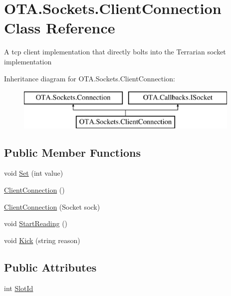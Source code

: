\hypertarget{class_o_t_a_1_1_sockets_1_1_client_connection}{}\section{O\+T\+A.\+Sockets.\+Client\+Connection Class Reference}
\label{class_o_t_a_1_1_sockets_1_1_client_connection}


A tcp client implementation that directly bolts into the Terrarian socket implementation  


Inheritance diagram for O\+T\+A.\+Sockets.\+Client\+Connection\+:\begin{figure}[H]
\begin{center}
\leavevmode
\includegraphics[height=2.000000cm]{class_o_t_a_1_1_sockets_1_1_client_connection}
\end{center}
\end{figure}
\subsection*{Public Member Functions}
\begin{DoxyCompactItemize}
\item 
void \hyperlink{class_o_t_a_1_1_sockets_1_1_client_connection_a770766c35a3ead39c9bcb0798bc5dcdc}{Set} (int value)
\item 
\hyperlink{class_o_t_a_1_1_sockets_1_1_client_connection_a65f8996d009af59680de5f45b9084a67}{Client\+Connection} ()
\item 
\hyperlink{class_o_t_a_1_1_sockets_1_1_client_connection_ac49558634e78478cdf3151ca6bb931e0}{Client\+Connection} (Socket sock)
\item 
void \hyperlink{class_o_t_a_1_1_sockets_1_1_client_connection_af385791e5187389d51274855d23f50a4}{Start\+Reading} ()
\item 
void \hyperlink{class_o_t_a_1_1_sockets_1_1_client_connection_aa50626295d0b996e369d7e8f42bd0edb}{Kick} (string reason)
\end{DoxyCompactItemize}
\subsection*{Public Attributes}
\begin{DoxyCompactItemize}
\item 
int \hyperlink{class_o_t_a_1_1_sockets_1_1_client_connection_ad4c258a26c87be978e43c5f376322210}{Slot\+Id}
\end{DoxyCompactItemize}
